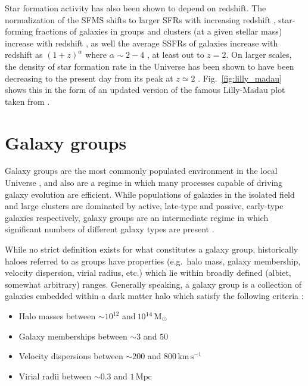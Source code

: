 Star formation activity has also been shown to depend on redshift.
The normalization of the SFMS shifts to larger SFRs with increasing
redshift \citep{karim2011, whitaker2012, lee2015, erfanianfar2016},
star-forming fractions of galaxies in groups and clusters (at a given
stellar mass) increase with redshift \citep{mcgee2011, hou2013,
  nantais2013}, as well the average SSFRs of galaxies increase with
redshift as $(1+z)^\alpha$ where $\alpha \sim 2-4$
\citep{oliver2010, whitaker2012}, at least out to $z=2$.  On larger
scales, the density of star formation rate in the Universe has been
shown to have been decreasing to the present day from its peak at $z
\simeq 2$ \citep[e.g.][]{madau1998, madau2014}.
Fig.~\ref{fig:lilly_madau} shows this in the form of an updated
version of the famous Lilly-Madau plot taken from \citet{madau2014}.

\section{Galaxy groups}
\label{sec:groups}

Galaxy groups are the most commonly populated environment in the local
Universe \citep{geller1983, eke2005}, and also are a regime in which
many processes capable of driving galaxy evolution are efficient.
While populations of galaxies in the isolated field and large clusters are
dominated by active, late-type and passive, early-type galaxies
respectively, galaxy groups are an intermediate regime in which
significant numbers of different galaxy types are present
\citep{wilman2005, mcgee2011}.
\par
While no strict definition exists for what constitutes a galaxy
group, historically haloes referred to as groups have properties
(e.g.\ halo mass, galaxy membership, velocity dispersion, virial
radius, etc.) which lie within broadly defined (albiet, somewhat
arbitrary) ranges.  Generally
speaking, a galaxy group is a collection of galaxies embedded within a
dark matter halo which satisfy the following criteria
\citep{mamon2007, connelly2012}:

\begin{itemize}
  \item Halo masses between $\sim\!10^{12}$ and $\!10^{14}\,\mathrm{M_{\odot}}$

  \item Galaxy memberships between $\sim\!3$ and $50$

  \item Velocity dispersions between $\sim\!200$ and
    $800\,\mathrm{km}\,\mathrm{s^{-1}}$
  
  \item Virial radii between $\sim\! 0.3$ and $1\,\mathrm{Mpc}$
\end{itemize}

